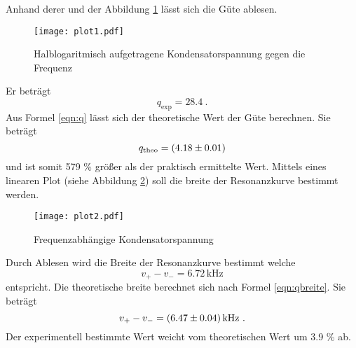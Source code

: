 Anhand derer und der Abbildung \ref{fig:logUc} lässt sich die Güte ablesen.
\begin{figure}
  \centering
  \texttt{[image: plot1.pdf]}
  \caption{Halblogaritmisch aufgetragene Kondensatorspannung gegen die Frequenz}
  \label{fig:logUc}
\end{figure}
Er beträgt
\begin{equation}
  q_\text{exp} = 28.4 \ .
  \label{eqn:qexp}
\end{equation}
Aus Formel \ref{eqn:q} lässt sich der theoretische Wert der Güte berechnen. Sie beträgt
\begin{equation}
  q_\text{theo} = (\num{4.18 +- 0.01})
  \label{eqn:qtheo}
\end{equation}
und ist somit 579 \% größer als der praktisch ermittelte Wert. Mittels eines linearen Plot (siehe Abbildung \ref{fig:fUc}) soll die breite der Resonanzkurve bestimmt werden.
\begin{figure}
  \centering
  \texttt{[image: plot2.pdf]}
  \caption{Frequenzabhängige Kondensatorspannung}
  \label{fig:fUc}
\end{figure}
Durch Ablesen wird die Breite der Resonanzkurve bestimmt welche
\begin{equation}
  v_+ - v_- = 6.72 \, \text{kHz}
\end{equation}
entspricht. Die theoretische breite berechnet sich nach Formel \ref{eqn:qbreite}. Sie beträgt
\begin{equation}
v_+ - v_- = (\num{6.47 +- 0.04}) \, \text{kHz} \ .
\end{equation}
Der experimentell bestimmte Wert weicht vom theoretischen Wert um 3.9 \% ab.
